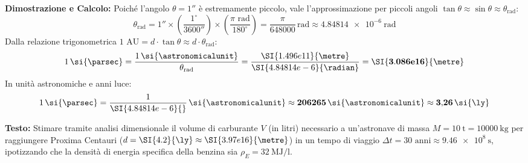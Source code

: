 \begin{center}
\end{center}

\textbf{Dimostrazione e Calcolo:}
Poiché l'angolo $\theta = 1''$ è estremamente piccolo, vale l'approssimazione per piccoli angoli $\tan\theta \approx \sin\theta \approx \theta_{\text{rad}}$:
\begin{equation}
    \theta_{\text{rad}} = 1'' \times \left(\frac{1^\circ}{3600''}\right) \times \left(\frac{\pi\text{ rad}}{180^\circ}\right) = \frac{\pi}{648000}\,\si{\radian} \approx \SI{4.84814e-6}{\radian}
\end{equation}
Dalla relazione trigonometrica $1\text{ AU} = d \cdot \tan\theta \approx d \cdot \theta_{\text{rad}}$:
\begin{equation}
    1\,\si{\parsec} = \frac{1\,\si{\astronomicalunit}}{\theta_{\text{rad}}} = \frac{\SI{1.496e11}{\metre}}{\SI{4.84814e-6}{\radian}} = \mathbf{\SI{3.086e16}{\metre}}
\end{equation}
In unità astronomiche e anni luce:
\begin{equation}
    1\,\si{\parsec} = \frac{1}{\SI{4.84814e-6}{}}\,\si{\astronomicalunit} \approx \mathbf{206265\,\si{\astronomicalunit}} \approx \mathbf{3{,}26\,\si{\ly}}
\end{equation}

\begin{esercizio}
\textbf{Testo:}
Stimare tramite analisi dimensionale il volume di carburante $V$ (in litri) necessario a un'astronave di massa $M = \SI{10}{\tonne} = \SI{10000}{\kilogram}$ per raggiungere Proxima Centauri ($d = \SI{4.2}{\ly} \approx \SI{3.97e16}{\metre}$) in un tempo di viaggio $\Delta t = 30\text{ anni} \approx \SI{9.46e8}{\second}$, ipotizzando che la densità di energia specifica della benzina sia $\rho_E = \SI{32}{\mega\joule\per\litre}$.
\end{esercizio}

